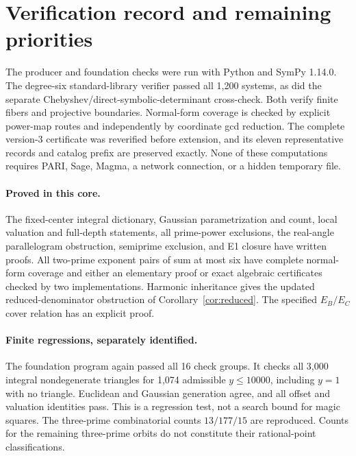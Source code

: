 \documentclass[11pt]{article}
\theoremstyle{definition}\newtheorem{definition}[theorem]{Definition}
\theoremstyle{remark}\newtheorem{remark}[theorem]{Remark}
\begin{document}
\section{Verification record and remaining priorities}\label{sec:status}
The producer and foundation checks were run with Python and SymPy 1.14.0. The degree-six standard-library verifier passed all 1,200 systems, as did the separate Chebyshev/direct-symbolic-determinant cross-check. Both verify finite fibers and projective boundaries. Normal-form coverage is checked by explicit power-map routes and independently by coordinate gcd reduction. The complete version-3 certificate was reverified before extension, and its eleven representative records and catalog prefix are preserved exactly. None of these computations requires PARI, Sage, Magma, a network connection, or a hidden temporary file.

\paragraph{Proved in this core.}
The fixed-center integral dictionary, Gaussian parametrization and count, local valuation and full-depth statements, all prime-power exclusions, the real-angle parallelogram obstruction, semiprime exclusion, and E1 closure have written proofs. All two-prime exponent pairs of sum at most six have complete normal-form coverage and either an elementary proof or exact algebraic certificates checked by two implementations. Harmonic inheritance gives the updated reduced-denominator obstruction of Corollary~\ref{cor:reduced}. The specified $E_B/E_C$ cover relation has an explicit proof.

\paragraph{Finite regressions, separately identified.}
The foundation program again passed all 16 check groups. It checks all 3,000 integral nondegenerate triangles for 1,074 admissible $y\le10000$, including $y=1$ with no triangle. Euclidean and Gaussian generation agree, and all offset and valuation identities pass. This is a regression test, not a search bound for magic squares. The three-prime combinatorial counts $13/177/15$ are reproduced. Counts for the remaining three-prime orbits do not constitute their rational-point classifications.
\end{document}
